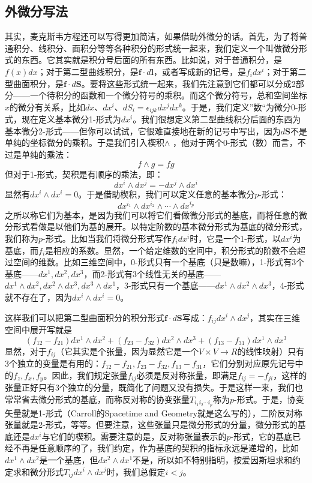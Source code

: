 \documentclass{ctexart}
\begin{document}
\subsection{外微分写法}
其实，麦克斯韦方程还可以写得更加简洁，如果借助外微分的话。首先，为了将普通积分、线积分、面积分等等各种积分的形式统一起来，我们定义一个叫做微分形式的东西。它其实就是积分号后面的所有东西。比如说，对于普通积分，是$f(x)dx$；对于第二型曲线积分，是$\bm{f}\cdot d\bm{l}$，或者写成新的记号，是$f_idx^i$；对于第二型曲面积分，是$\bm{f}\cdot d\bm{S}$。要将这些形式统一起来，我们先注意到它们都可以分成2部分——一个待积分的函数和一个微分符号的乘积。而这个微分符号，总和空间坐标$x$的微分有关系，比如$dx$、$dx^i$、$dS_i=\epsilon_{ijk}dx^jdx^k$。于是，我们定义”数“为微分0-形式，现在定义基本微分1-形式为$dx^i$。我们很想定义第二型曲线积分后面的东西为基本微分2-形式——但你可以试试，它很难直接地在新的记号中写出，因为$d\bm{S}$不是单纯的坐标微分的乘积。于是我们引入楔积$\wedge$ ，他对于两个0-形式（数）而言，不过是单纯的乘法：
\begin{equation}
f\wedge g=fg
\end{equation}
但对于1-形式，契积是有顺序的乘法，即：
\begin{equation}
dx^i\wedge dx^j=-dx^j\wedge dx^i
\end{equation}
显然有$dx^i\wedge dx^i=0$。于是借助楔积，我们可以定义任意的基本微分$p$-形式：
\begin{equation}
dx^{i_1}\wedge dx^{i_2}\wedge \cdots\wedge dx^{i_p}
\end{equation}
之所以称它们为基本，是因为我们可以将它们看做微分形式的基底，而将任意的微分形式看做是以他们为基的展开。以特定阶数的基本微分形式为基底的微分形式，我们称为$p$-形式。比如当我们将微分形式写作$f_idx^i$时，它是一个1-形式，以$dx^i$为基底，而$f_i$是相应的系数。显然，一个给定维数的空间中，积分形式的阶数不会超过空间的维数。比如三维空间中，0-形式只有一个基底（只是数嘛），1-形式有3个基底——$dx^1,dx^2,dx^3$，而2-形式有3个线性无关的基底——$dx^1\wedge dx^2,dx^2\wedge dx^3,dx^3\wedge dx^1$，3-形式只有一个基底——$dx^1\wedge dx^2\wedge dx^3$，4-形式就不存在了，因为$dx^i\wedge dx^i=0$。

这样我们可以把第二型曲面积分的积分形式$\bm{f}\cdot d\bm{S}$写成：$f_{ij}dx^i\wedge dx^j$，其实在三维空间中展开写就是
\begin{equation}
(f_{12}-f_{21})dx^1\wedge dx^2+(f_{23}-f_{32})dx^2\wedge dx^3+(f_{13}-f_{31})dx^1\wedge dx^3
\end{equation}
显然，对于$f_{ij}$（它其实是个张量，因为显然它是一个$V\times V\to R$的线性映射）只有3个独立的变量是有用的：$f_{12}-f_{21},f_{23}-f_{32},f_{13}-f_{31}$，它们分别对应原先记号中的$f_z,f_x,f_y$。因此，我们规定张量$f_{ij}$必须是反对称张量，即满足$f_{ij}=-f_{ji}$，这样的张量正好只有3个独立的分量，既简化了问题又没有损失。于是这样一来，我们也常常省去微分形式的基底，而称反对称的协变张量$T_{i_1i_2\cdots i_p}$称为$p$-形式。于是，协变矢量就是1-形式（Carroll的Spacetime and Geometry就是这么写的），二阶反对称张量就是2-形式，等等。但要注意，这些张量只是微分形式的分量，微分形式的基底还是$dx^i$与它们的楔积。需要注意的是，反对称张量表示的$p$-形式，它的基底已经不再是任意顺序的了，我们约定，作为基底的契积的指标永远是递增的，比如$dx^1\wedge dx^2$是一个基底，但$dx^2\wedge dx^1$不是，所以如不特别指明，按爱因斯坦求和约定求和微分形式$T_{ij}dx^i\wedge dx^j$时，我们总假定$i<j$。
\end{document}
